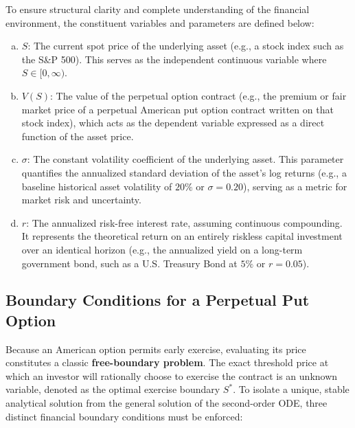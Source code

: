 \documentclass[12pt]{article}
\theoremstyle{definition}
\numberwithin{equation}{section}
\begin{document}
To ensure structural clarity and complete understanding of the financial environment, the constituent variables and parameters are defined below:
\begin{enumerate}[(a)]
    \item $S$: The current spot price of the underlying asset 
    (e.g., a stock index such as the S\&P 500). 
    This serves as the independent continuous variable where $S \in [0, \infty)$.
    \item $V(S)$: The value of the perpetual option contract 
    (e.g., the premium or fair market price of a perpetual American put option 
    contract written on that stock index), which acts as the dependent variable expressed 
    as a direct function of the asset price.
    \item $\sigma$: The constant volatility coefficient of the underlying asset. 
    This parameter quantifies the annualized standard deviation of the asset's log returns 
    (e.g., a baseline historical asset volatility of $20\%$ or $\sigma = 0.20$), 
    serving as a metric for market risk and uncertainty.
    \item $r$: The annualized risk-free interest rate, assuming continuous compounding. 
    It represents the theoretical return on an entirely riskless capital investment over 
    an identical horizon (e.g., the annualized yield on a long-term government bond, 
    such as a U.S. Treasury Bond at $5\%$ or $r = 0.05$).
\end{enumerate}

\subsection{Boundary Conditions for a Perpetual Put Option}
Because an American option permits early exercise, evaluating its price constitutes a classic \textbf{free-boundary problem}. The exact threshold price at which an investor will rationally choose to exercise the contract is an unknown variable, denoted as the optimal exercise boundary $S^*$. To isolate a unique, stable analytical solution from the general solution of the second-order ODE, three distinct financial boundary conditions must be enforced:
\end{document}
